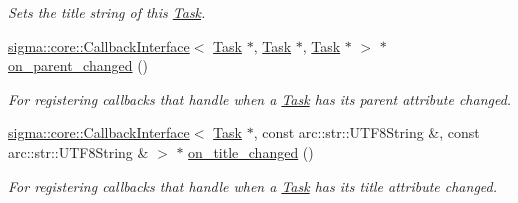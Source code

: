 \begin{DoxyCompactItemize}
\begin{DoxyCompactList}\small\item\em Sets the title string of this \hyperlink{classsigma_1_1core_1_1tasks_1_1_task}{Task}. \end{DoxyCompactList}\item 
\hyperlink{classsigma_1_1core_1_1_callback_interface}{sigma\+::core\+::\+Callback\+Interface}$<$ \hyperlink{classsigma_1_1core_1_1tasks_1_1_task}{Task} $\ast$, \hyperlink{classsigma_1_1core_1_1tasks_1_1_task}{Task} $\ast$, \hyperlink{classsigma_1_1core_1_1tasks_1_1_task}{Task} $\ast$ $>$ $\ast$ \hyperlink{classsigma_1_1core_1_1tasks_1_1_task_a4947e26b1208f36cf4bab3f2091db786}{on\+\_\+parent\+\_\+changed} ()
\begin{DoxyCompactList}\small\item\em For registering callbacks that handle when a \hyperlink{classsigma_1_1core_1_1tasks_1_1_task}{Task} has its parent attribute changed. \end{DoxyCompactList}\item 
\hyperlink{classsigma_1_1core_1_1_callback_interface}{sigma\+::core\+::\+Callback\+Interface}$<$ \hyperlink{classsigma_1_1core_1_1tasks_1_1_task}{Task} $\ast$, const arc\+::str\+::\+U\+T\+F8\+String \&, const arc\+::str\+::\+U\+T\+F8\+String \& $>$ $\ast$ \hyperlink{classsigma_1_1core_1_1tasks_1_1_task_adf2cc518f58adaa3d641d778d82a49c7}{on\+\_\+title\+\_\+changed} ()
\begin{DoxyCompactList}\small\item\em For registering callbacks that handle when a \hyperlink{classsigma_1_1core_1_1tasks_1_1_task}{Task} has its title attribute changed. \end{DoxyCompactList}\end{DoxyCompactItemize}
